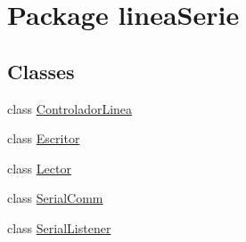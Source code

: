 \hypertarget{namespacelinea_serie}{}\section{Package linea\+Serie}
\label{namespacelinea_serie}
\subsection*{Classes}
\begin{DoxyCompactItemize}
\item 
class \mbox{\hyperlink{classlinea_serie_1_1_controlador_linea}{Controlador\+Linea}}
\item 
class \mbox{\hyperlink{classlinea_serie_1_1_escritor}{Escritor}}
\item 
class \mbox{\hyperlink{classlinea_serie_1_1_lector}{Lector}}
\item 
class \mbox{\hyperlink{classlinea_serie_1_1_serial_comm}{Serial\+Comm}}
\item 
class \mbox{\hyperlink{classlinea_serie_1_1_serial_listener}{Serial\+Listener}}
\end{DoxyCompactItemize}
